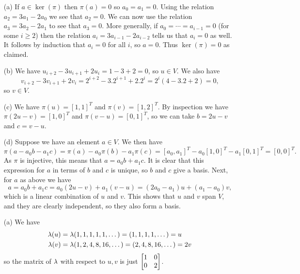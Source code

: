  \begin{itemize}
  \item[(a)] If $a\in\ker(\pi)$ then $\pi(a)=0$ so $a_0=a_1=0$.
   Using the relation $a_2=3a_1-2a_0$ we see that $a_2=0$.  We
   can now use the relation $a_3=3a_2-2a_1$ to see that $a_3=0$.
   More generally, if $a_0=\dotsb=a_{i-1}=0$ (for some $i\geq 2$)
   then the relation $a_i=3a_{i-1}-2a_{i-2}$ tells us that
   $a_i=0$ as well.  It follows by induction that $a_i=0$ for
   all $i$, so $a=0$.  Thus $\ker(\pi)=0$ as claimed.
  \item[(b)] We have $u_{i+2}-3u_{i+1}+2u_i=1-3+2=0$, so
   $u\in V$.  We also have
   \[ v_{i+2}-3v_{i+1}+2v_i = 2^{i+2}-3.2^{i+1}+2.2^i =
      2^i(4 - 3.2 +2) = 0,
   \]
   so $v\in V$.
  \item[(c)] We have $\pi(u)=[1,1]^T$ and $\pi(v)=[1,2]^T$.  By
  inspection we have $\pi(2u-v)=[1,0]^T$ and $\pi(v-u)=[0,1]^T$, so we
  can take $b=2u-v$ and $c=v-u$.
  \item[(d)] Suppose we have an element $a\in V$.  We then have
   \[ \pi(a - a_0b - a_1c) = \pi(a) - a_0\pi(b) - a_1\pi(c)
      = [a_0,a_1]^T - a_0[1,0]^T - a_1[0,1]^T = [0,0]^T.
   \]
   As $\pi$ is injective, this means that $a=a_0b+a_1c$.  It is
   clear that this expression for $a$ in terms of $b$ and $c$ is
   unique, so $b$ and $c$ give a basis.  Next, for $a$ as above
   we have
   \[ a=a_0b+a_1c=a_0(2u-v)+a_1(v-u) = (2a_0-a_1)u+(a_1-a_0)v,
   \]
   which is a linear combination of $u$ and $v$.  This shows
   that $u$ and $v$ span $V$, and they are clearly independent,
   so they also form a basis.
  \item[(a)] We have
   \begin{align*}
    \lambda(u) &= \lambda(1,1,1,1,1,\dotsc) = (1,1,1,1,\dotsc) = u \\
    \lambda(v) &= \lambda(1,2,4,8,16,\dotsc) = (2,4,8,16,\dotsc) = 2v
   \end{align*}
   so the matrix of $\lambda$ with respect to $u,v$ is just
   $\left[\begin{matrix} 1&0\\0&2\end{matrix}\right]$.
 \end{itemize}
\EndDeferredSolution

